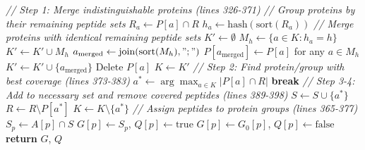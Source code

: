 \documentclass{article}
\begin{document}
\begin{algorithm}[H]
\begin{algorithmic}[1]
        \State \textit{// Step 1: Merge indistinguishable proteins (lines 326-371)}
        \State \textit{// Group proteins by their remaining peptide sets}
            \State $R_a \gets P[a] \cap R$ 
            \State $h_a \gets \text{hash}(\text{sort}(R_a))$ 
        \EndFor
        \State \textit{// Merge proteins with identical remaining peptide sets}
        \State $K' \gets \emptyset$ 
            \State $M_h \gets \{a \in K : h_a = h\}$ 
                \State $K' \gets K' \cup M_h$ 
            \Else
                \State $a_{\text{merged}} \gets \text{join}(\text{sort}(M_h), ";")$ 
                \State $P[a_{\text{merged}}] \gets P[a]$ for any $a \in M_h$ 
                \State $K' \gets K' \cup \{a_{\text{merged}}\}$
                    \State Delete $P[a]$ 
                \EndFor
            \EndIf
        \EndFor
        \State $K \gets K'$ 
        \State
        \State \textit{// Step 2: Find protein/group with best coverage (lines 373-383)}
        \State $a^* \gets \arg\max_{a \in K} |P[a] \cap R|$ 
            \State \textbf{break} 
        \EndIf
        \State
        \State \textit{// Step 3-4: Add to necessary set and remove covered peptides (lines 389-398)}
        \State $S \gets S \cup \{a^*\}$ 
        \State $R \gets R \setminus P[a^*]$ 
        \State $K \gets K \setminus \{a^*\}$ 
    \EndWhile
    \State
    \State \textit{// Assign peptides to protein groups (lines 365-377)}
        \State $S_p \gets A[p] \cap S$ 
            \State $G[p] \gets S_p$, $Q[p] \gets \text{true}$ 
        \Else
            \State $G[p] \gets G_0[p]$, $Q[p] \gets \text{false}$ 
        \EndIf
    \EndFor
\EndFor
\State
\State \textbf{return} $G$, $Q$ 
\end{algorithmic}
\end{algorithm}
\end{document}
